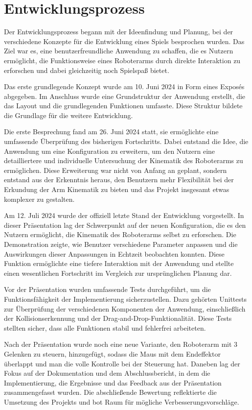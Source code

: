 \documentclass[12pt]{article}
\begin{document}
    \section{Entwicklungsprozess}
    Der Entwicklungsprozess begann mit der Ideenfindung und Planung, bei der verschiedene Konzepte für die Entwicklung
    eines Spiels besprochen wurden. Das Ziel war es, eine benutzerfreundliche Anwendung zu schaffen, die es Nutzern
    ermöglicht, die Funktionsweise eines Roboterarms durch direkte Interaktion zu erforschen und dabei gleichzeitig
    noch Spielspaß bietet.

    Das erste grundlegende Konzept wurde am 10. Juni 2024 in Form eines Exposés abgegeben. Im Anschluss wurde eine
    Grundstruktur der Anwendung erstellt, die das Layout und die grundlegenden Funktionen umfasste. Diese Struktur
    bildete die Grundlage für die weitere Entwicklung.

    Die erste Besprechung fand am 26. Juni 2024 statt, sie ermöglichte eine umfassende Überprüfung des bisherigen
    Fortschritts. Dabei entstand die Idee, die Anwendung um eine Konfiguration zu erweitern, um den Nutzern eine
    detailliertere und individuelle Untersuchung der Kinematik des Roboterarms zu ermöglichen. Diese Erweiterung war
    nicht von Anfang an geplant, sondern entstand aus der Erkenntnis heraus, den Benutzern mehr Flexibilität bei der
    Erkundung der Arm Kinematik zu bieten und das Projekt insgesamt etwas komplexer zu gestalten.

    Am 12. Juli 2024 wurde der offiziell letzte Stand der Entwicklung vorgestellt. In dieser Präsentation lag der
    Schwerpunkt auf der neuen Konfiguration, die es den Nutzern ermöglicht, die Kinematik des Roboterarms selbst zu
    erforschen. Die Demonstration zeigte, wie Benutzer verschiedene Parameter anpassen und die Auswirkungen dieser
    Anpassungen in Echtzeit beobachten konnten. Diese Funktion ermöglichte eine tiefere Interaktion mit der Anwendung
    und stellte einen wesentlichen Fortschritt im Vergleich zur ursprünglichen Planung dar.

    Vor der Präsentation wurden umfassende Tests durchgeführt, um die Funktionsfähigkeit der Implementierung
    sicherzustellen. Dazu gehörten Unittests zur Überprüfung der verschiedenen Komponenten der Anwendung,
    einschließlich der Kollisionserkennung und der Drag-and-Drop-Funktionalität. Diese Tests stellten sicher, dass
    alle Funktionen stabil und fehlerfrei arbeiteten.

    Nach der Präsentation wurde noch eine neue Variante, den Roboterarm mit 3 Gelenken zu steuern, hinzugefügt,
    sodass die Maus mit dem Endeffektor überlappt und man die volle Kontrolle bei der Steuerung hat. Daneben lag
    der Fokus auf der Dokumentation und dem Abschlussbericht, in dem die Implementierung, die Ergebnisse und das
    Feedback aus der Präsentation zusammengefasst wurden. Die abschließende Bewertung reflektierte die Umsetzung
    des Projekts und bot Raum für mögliche Verbesserungsvorschläge.
\end{document}
